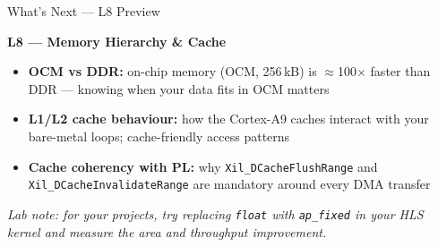 \documentclass[aspectratio=169,12pt]{beamer}
\begin{document}
\begin{frame}{What's Next --- L8 Preview}
\vspace{0.05cm}
\vspace{0.11cm}
{\color{Navy}\bfseries L8 --- Memory Hierarchy \& Cache}
\vspace{5pt}
\begin{itemize}\setlength{\itemsep}{2pt}
  \item[\color{Navy}$\blacktriangleright$]
    \textbf{OCM vs DDR:} on-chip memory (OCM, 256\,kB) is $\approx$100$\times$ faster
    than DDR --- knowing when your data fits in OCM matters
  \item[\color{Orange}$\blacktriangleright$]
    \textbf{L1/L2 cache behaviour:} how the Cortex-A9 caches interact
    with your bare-metal loops; cache-friendly access patterns
  \item[\color{Teal}$\blacktriangleright$]
    \textbf{Cache coherency with PL:}
    why \texttt{Xil\_DCacheFlushRange} and \texttt{Xil\_DCacheInvalidateRange}
    are mandatory around every DMA transfer
\end{itemize}
\vspace{0.07cm}
{\color{MidGray}\small\itshape
  Lab note: for your projects, try replacing \texttt{float} with
  \texttt{ap\_fixed} in your HLS kernel and measure the area and
  throughput improvement.}
\end{frame}
\end{document}
